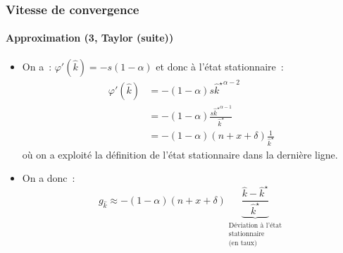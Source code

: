 \documentclass[10pt,notheorems]{beamer}
\theoremstyle{plain}
\theoremstyle{definition} %
\begin{document}
\begin{frame}
  \frametitle{Vitesse de convergence}
  \framesubtitle{Approximation (3, Taylor (suite))}

  \begin{itemize}

  \item On a~: $\varphi'(\hat k) = -s(1-\alpha)$ et donc à l'état stationnaire~:
    \[
      \begin{split}
        \varphi'(\hat k) &= -(1-\alpha) s \left. \hat k^\star \right. ^{\alpha-2}\\
                         &= -(1-\alpha) \frac{s \left. \hat k^\star \right. ^{\alpha-1}}{\hat k^\star}\\
                         &= -(1-\alpha)(n+x+\delta)\frac{1}{\hat k^\star}
      \end{split}
    \]
    où on a exploité la définition de l'état stationnaire dans la dernière ligne.\newline

  \item On a donc~:
    \[
      g_{\hat k} \approx -(1-\alpha)(n+x+\delta)\underbrace{\frac{\hat k - \hat k^{\star}}{\hat k^\star}}_{\substack{\text{Déviation à l'état}\\ \text{stationnaire}\\ \text{(en taux)}}}
    \]

  \end{itemize}

\end{frame}
\end{document}
